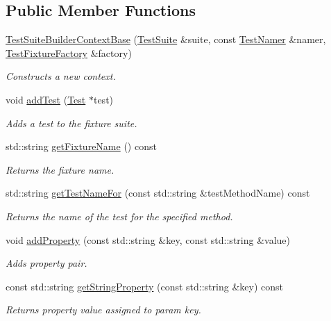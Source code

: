 \subsection*{Public Member Functions}
\begin{DoxyCompactItemize}
\item 
\hyperlink{class_test_suite_builder_context_base_a434b04354f7e326c7f88d015921d5e6d}{Test\-Suite\-Builder\-Context\-Base} (\hyperlink{class_test_suite}{Test\-Suite} \&suite, const \hyperlink{class_test_namer}{Test\-Namer} \&namer, \hyperlink{class_test_fixture_factory}{Test\-Fixture\-Factory} \&factory)
\begin{DoxyCompactList}\small\item\em Constructs a new context. \end{DoxyCompactList}\item 
void \hyperlink{class_test_suite_builder_context_base_a8b42185139e3efe07a0fe69b9549e928}{add\-Test} (\hyperlink{class_test}{Test} $\ast$test)
\begin{DoxyCompactList}\small\item\em Adds a test to the fixture suite. \end{DoxyCompactList}\item 
std\-::string \hyperlink{class_test_suite_builder_context_base_abba530361ccd63ddf23fcbdc4f33727f}{get\-Fixture\-Name} () const 
\begin{DoxyCompactList}\small\item\em Returns the fixture name. \end{DoxyCompactList}\item 
std\-::string \hyperlink{class_test_suite_builder_context_base_a137a255602edbdc2e1dc575fb53fee9e}{get\-Test\-Name\-For} (const std\-::string \&test\-Method\-Name) const 
\begin{DoxyCompactList}\small\item\em Returns the name of the test for the specified method. \end{DoxyCompactList}\item 
void \hyperlink{class_test_suite_builder_context_base_a358c75376f4d3df2ef570003cbe2e06a}{add\-Property} (const std\-::string \&key, const std\-::string \&value)
\begin{DoxyCompactList}\small\item\em Adds property pair. \end{DoxyCompactList}\item 
const std\-::string \hyperlink{class_test_suite_builder_context_base_a9955d3fda5115963ee0310d09a3b15d9}{get\-String\-Property} (const std\-::string \&key) const 
\begin{DoxyCompactList}\small\item\em Returns property value assigned to param key. \end{DoxyCompactList}\end{DoxyCompactItemize}
